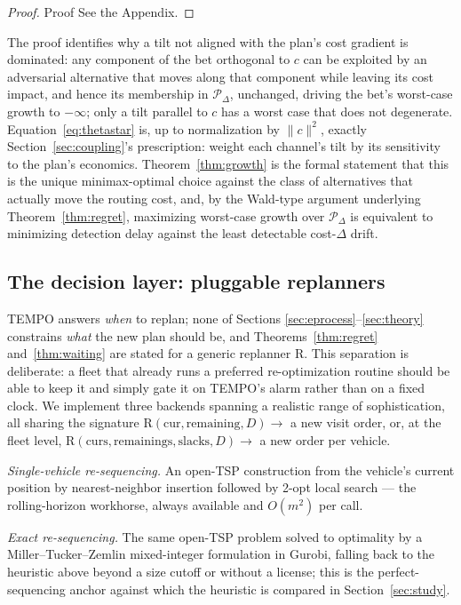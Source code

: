 \documentclass[trsc,dblanonrev]{informs4}
\newcommand{\Rmax}{\mathrm{R}}
\begin{document}
\begin{proof}{Proof}
See the Appendix.
\end{proof}

The proof identifies why a tilt not aligned with the plan's cost
gradient is dominated: any component of the bet orthogonal to $c$ can
be exploited by an adversarial alternative that moves along that
component while leaving its cost impact, and hence its membership in
$\mathcal P_\Delta$, unchanged, driving the bet's worst-case growth to
$-\infty$; only a tilt parallel to $c$ has a worst case that does not
degenerate. Equation~\eqref{eq:thetastar} is, up to normalization by
$\lVert c \rVert^2$, exactly Section~\ref{sec:coupling}'s prescription:
weight each channel's tilt by its sensitivity to the plan's economics.
Theorem~\ref{thm:growth} is the formal statement that this is the
unique minimax-optimal choice against the class of alternatives that
actually move the routing cost, and, by the Wald-type argument
underlying Theorem~\ref{thm:regret}, maximizing worst-case growth over
$\mathcal P_\Delta$ is equivalent to minimizing detection delay against
the least detectable cost-$\Delta$ drift.

\subsection{The decision layer: pluggable replanners}\label{sec:decision}

TEMPO answers \emph{when} to replan; none of Sections
\ref{sec:eprocess}--\ref{sec:theory} constrains \emph{what} the new
plan should be, and Theorems~\ref{thm:regret} and~\ref{thm:waiting} are
stated for a generic replanner $\Rmax$. This separation is deliberate:
a fleet that already runs a preferred re-optimization routine should be
able to keep it and simply gate it on TEMPO's alarm rather than on a
fixed clock. We implement three backends spanning a realistic range of
sophistication, all sharing the signature $\Rmax(\mathrm{cur},
\mathrm{remaining}, D) \to$ a new visit order, or, at the fleet level,
$\Rmax(\mathrm{curs}, \mathrm{remainings}, \mathrm{slacks}, D) \to$ a
new order per vehicle.

\emph{Single-vehicle re-sequencing.} An open-TSP construction from the
vehicle's current position by nearest-neighbor insertion followed by
2-opt local search --- the rolling-horizon workhorse, always available
and $O(m^2)$ per call.

\emph{Exact re-sequencing.} The same open-TSP problem solved to
optimality by a Miller--Tucker--Zemlin mixed-integer formulation in
Gurobi, falling back to the heuristic above beyond a size cutoff or
without a license; this is the perfect-sequencing anchor against which
the heuristic is compared in Section~\ref{sec:study}.
\end{document}
